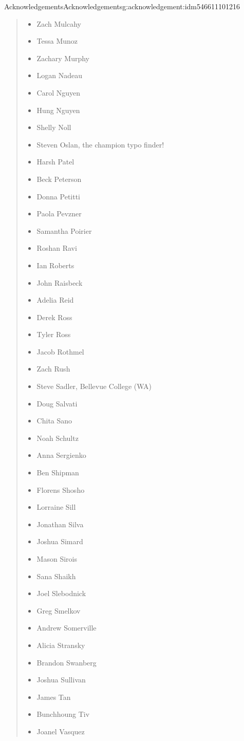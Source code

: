 \documentclass[oneside,10pt,]{book}
\numberwithin{equation}{section}
\begin{document}
\begin{acknowledgement}{Acknowledgements}{}{Acknowledgements}{}{}{g:acknowledgement:idm546611101216}
\begin{quote}
\begin{multicols}{2}
\begin{itemize}[label=\textbullet]
\item{}Zach Mulcahy%
\item{}Tessa Munoz%
\item{}Zachary Murphy%
\item{}Logan Nadeau%
\item{}Carol Nguyen%
\item{}Hung Nguyen%
\item{}Shelly Noll%
\item{}Steven Oslan, the champion typo finder!%
\item{}Harsh Patel%
\item{}Beck Peterson%
\item{}Donna Petitti%
\item{}Paola Pevzner%
\item{}Samantha Poirier%
\item{}Roshan Ravi%
\item{}Ian Roberts%
\item{}John Raisbeck%
\item{}Adelia Reid%
\item{}Derek Ross%
\item{}Tyler Ross%
\item{}Jacob Rothmel%
\item{}Zach Rush%
\item{}Steve Sadler, Bellevue College (WA)%
\item{}Doug Salvati%
\item{}Chita Sano%
\item{}Noah Schultz%
\item{}Anna Sergienko%
\item{}Ben Shipman%
\item{}Florens Shosho%
\item{}Lorraine Sill%
\item{}Jonathan Silva%
\item{}Joshua Simard%
\item{}Mason Sirois%
\item{}Sana Shaikh%
\item{}Joel Slebodnick%
\item{}Greg Smelkov%
\item{}Andrew Somerville%
\item{}Alicia Stransky%
\item{}Brandon Swanberg%
\item{}Joshua Sullivan%
\item{}James Tan%
\item{}Bunchhoung Tiv%
\item{}Joanel Vasquez%

\end{itemize}
\end{multicols}
\end{quote}
\end{acknowledgement}
\end{document}
